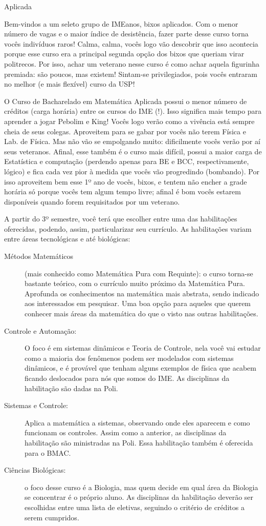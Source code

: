 \begin{subsecao}{Aplicada}

Bem-vindos a um seleto grupo de IMEanos, bixos aplicados. Com o menor número de
vagas e o maior índice de desistência, fazer parte desse curso torna vocês
indivíduos raros!  Calma, calma, vocês logo vão descobrir que isso acontecia
porque esse curso era a principal segunda opção dos bixos que queriam virar
politrecos. Por isso, achar um veterano nesse curso é como achar aquela
figurinha premiada: são poucos, mas existem! Sintam-se privilegiados, pois vocês
entraram no melhor (e mais flexível) curso da USP!

O Curso de Bacharelado em Matemática Aplicada possui o menor número de créditos
(carga horária) entre os cursos do IME (!). Isso significa mais tempo para
aprender a jogar Pebolim e King! Vocês logo verão como a vivência está sempre
cheia de seus colegas.  Aproveitem para se gabar por vocês não terem Física e
Lab. de Física. Mas não vão se empolgando muito: dificilmente vocês verão por aí
seus veteranos. Afinal, esse também é o curso mais difícil, possui a maior carga
de Estatística e computação (perdendo apenas para BE e BCC, respectivamente,
lógico) e fica cada vez pior à medida que vocês vão progredindo (bombando). Por
isso aproveitem bem esse 1º ano de vocês, bixos, e tentem não encher a grade
horária só porque vocês tem algum tempo livre; afinal é bom vocês estarem
disponíveis quando forem requisitados por um veterano.

A partir do 3º semestre, você terá que escolher entre uma das habilitações
oferecidas, podendo, assim, particularizar seu currículo. As habilitações variam
entre áreas tecnológicas e até biológicas:
\begin{description}
\item [Métodos Matemáticos] (mais conhecido como Matemática Pura com Requinte):
  o curso torna-se bastante teórico, com o currículo muito próximo da Matemática
  Pura. Aprofunda os conhecimentos na matemática mais abstrata, sendo indicado
  aos interessados em pesquisar. Uma boa opção para aqueles que querem conhecer
  mais áreas da matemática do que o visto nas outras habilitações.
\item [Controle e Automação:]  O foco é em sistemas dinâmicos e Teoria de
  Controle, nela você vai estudar como a maioria dos fenômenos podem ser
  modelados com sistemas dinâmicos, e é provável que tenham alguns exemplos de
  física que acabem ficando deslocados para nós que somos do IME. As disciplinas
  da habilitação são dadas na Poli.
\item [Sistemas e Controle:] Aplica a matemática a sistemas, observando onde
  eles aparecem e como funcionam os controles. Assim como a anterior, as
  disciplinas da habilitação são ministradas na Poli. Essa habilitação também é
  oferecida para o BMAC.
\item [Ciências Biológicas:] o foco desse curso é a Biologia, mas quem decide em
  qual área da Biologia se concentrar é o próprio aluno. As disciplinas da
  habilitação deverão ser escolhidas entre uma lista de eletivas, seguindo o
  critério de créditos a serem cumpridos.
\end{description}


\end{subsecao}
